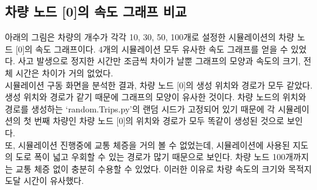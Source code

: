 \subsection*{차량 노드 [0]의 속도 그래프 비교}
    아래의 그림은 차량의 개수가 각각 10, 30, 50, 100개로 설정한 시뮬레이션의 차량 노드 [0]의 속도 그래프이다. 4개의 시뮬레이션 모두 유사한 속도 그래프를 얻을 수 있었다. 사고 발생으로 정지한 시간만 조금씩 차이가 날뿐 그래프의 모양과 속도의 크기, 전체 시간은 차이가 거의 없었다. \\
    시뮬레이션 구동 화면을 분석한 결과, 차량 노드 [0]의 생성 위치와 경로가 모두 같았다. 생성 위치와 경로가 같기 때문에 그래프의 모양이 유사한 것이다. 차량 노드의 위치와 경로를 생성하는 ‘random.Trips.py’의 랜덤 시드가 고정되어 있기 때문에 각 시뮬레이션의 첫 번째 차량인 차량 노드 [0]의 위치와 경로가 모두 똑같이 생성된 것으로 보인다. \\
    또, 시뮬레이션 진행중에 교통 체증을 거의 볼 수 없었는데, 시뮬레이션에 사용된 지도의 도로 폭이 넓고 우회할 수 있는 경로가 많기 때문으로 보인다. 차량 노드 100개까지는 교통 체증 없이 충분히 수용할 수 있었다. 이러한 이유로 차량 속도의 크기와 목적지 도달 시간이 유사했다.
    \vspace{-3mm}
